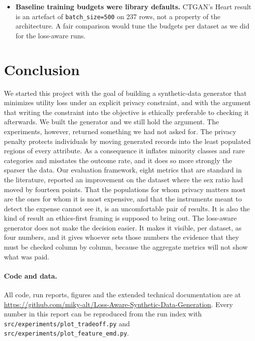 \documentclass[11pt,a4paper]{article}
\newcommand{\lpriv}{\lambda_{\text{priv}}}
\begin{document}
\begin{itemize}[nosep]
        (\S\ref{sec:results:ctgan}) covers Heart only, at a single
        $\lpriv$ that turned out to be past CTGAN's knee, so it establishes
        that the utility-term privacy gain is TVAE-specific but does not
        locate CTGAN's own trade-off curve. The Gaussian copula has no
        gradient-based training and cannot be made loss-aware in this sense.
  \item \textbf{Baseline training budgets were library defaults.} CTGAN's
        Heart result is an artefact of \texttt{batch\_size=500} on 237 rows,
        not a property of the architecture. A fair comparison would tune the
        budgets per dataset as we did for the loss-aware runs.
\end{itemize}

\section{Conclusion}

We started this project with the goal of building a synthetic-data generator
that minimizes utility loss under an explicit privacy constraint, and with the
argument that writing the constraint into the objective is ethically
preferable to checking it afterwards. We built the generator and we still
hold the argument. The experiments, however, returned something we had not
asked for. The privacy penalty protects individuals by moving generated
records into the least populated regions of every attribute. As a consequence
it inflates minority classes and rare categories and misstates the outcome
rate, and it does so more strongly the sparser the data. Our evaluation
framework, eight metrics that are standard in the literature, reported an
improvement on the dataset where the sex ratio had moved by fourteen points.
That the populations for whom privacy matters most are the ones for whom it is
most expensive, and that the instruments meant to detect the expense cannot
see it, is an uncomfortable pair of results. It is also the kind of result an
ethics-first framing is supposed to bring out. The loss-aware generator does
not make the decision easier. It makes it visible, per dataset, as four
numbers, and it gives whoever sets those numbers the evidence that they must
be checked column by column, because the aggregate metrics will not show what
was paid.

\paragraph{Code and data.}
All code, run reports, figures and the extended technical documentation are at
\url{https://github.com/miky-alt/Loss-Aware-Synthetic-Data-Generation}. Every
number in this report can be reproduced from the
run index with \texttt{src/experiments/plot\_tradeoff.py} and
\texttt{src/experiments/plot\_feature\_emd.py}.
\end{document}

